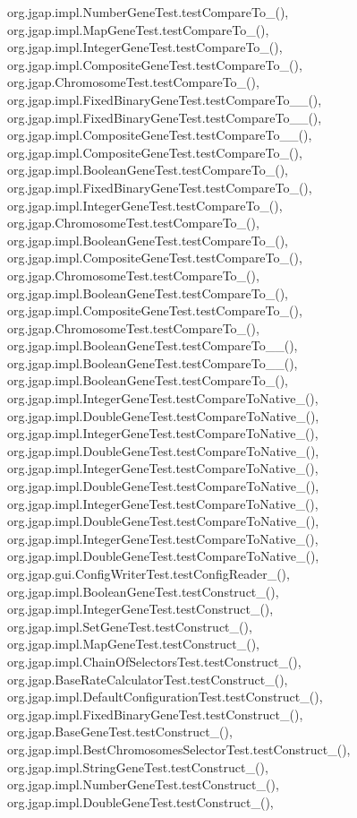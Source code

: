 org.\-jgap.\-impl.\-Number\-Gene\-Test.\-test\-Compare\-To\-\_(), org.\-jgap.\-impl.\-Map\-Gene\-Test.\-test\-Compare\-To\-\_(), org.\-jgap.\-impl.\-Integer\-Gene\-Test.\-test\-Compare\-To\-\_(), org.\-jgap.\-impl.\-Composite\-Gene\-Test.\-test\-Compare\-To\-\_(), org.\-jgap.\-Chromosome\-Test.\-test\-Compare\-To\-\_(), org.\-jgap.\-impl.\-Fixed\-Binary\-Gene\-Test.\-test\-Compare\-To\-\_\-\_(), org.\-jgap.\-impl.\-Fixed\-Binary\-Gene\-Test.\-test\-Compare\-To\-\_\-\_(), org.\-jgap.\-impl.\-Composite\-Gene\-Test.\-test\-Compare\-To\-\_\-\_(), org.\-jgap.\-impl.\-Composite\-Gene\-Test.\-test\-Compare\-To\-\_(), org.\-jgap.\-impl.\-Boolean\-Gene\-Test.\-test\-Compare\-To\-\_(), org.\-jgap.\-impl.\-Fixed\-Binary\-Gene\-Test.\-test\-Compare\-To\-\_(), org.\-jgap.\-impl.\-Integer\-Gene\-Test.\-test\-Compare\-To\-\_(), org.\-jgap.\-Chromosome\-Test.\-test\-Compare\-To\-\_(), org.\-jgap.\-impl.\-Boolean\-Gene\-Test.\-test\-Compare\-To\-\_(), org.\-jgap.\-impl.\-Composite\-Gene\-Test.\-test\-Compare\-To\-\_(), org.\-jgap.\-Chromosome\-Test.\-test\-Compare\-To\-\_(), org.\-jgap.\-impl.\-Boolean\-Gene\-Test.\-test\-Compare\-To\-\_(), org.\-jgap.\-impl.\-Composite\-Gene\-Test.\-test\-Compare\-To\-\_(), org.\-jgap.\-Chromosome\-Test.\-test\-Compare\-To\-\_(), org.\-jgap.\-impl.\-Boolean\-Gene\-Test.\-test\-Compare\-To\-\_\-\_(), org.\-jgap.\-impl.\-Boolean\-Gene\-Test.\-test\-Compare\-To\-\_\-\_(), org.\-jgap.\-impl.\-Boolean\-Gene\-Test.\-test\-Compare\-To\-\_(), org.\-jgap.\-impl.\-Integer\-Gene\-Test.\-test\-Compare\-To\-Native\-\_(), org.\-jgap.\-impl.\-Double\-Gene\-Test.\-test\-Compare\-To\-Native\-\_(), org.\-jgap.\-impl.\-Integer\-Gene\-Test.\-test\-Compare\-To\-Native\-\_(), org.\-jgap.\-impl.\-Double\-Gene\-Test.\-test\-Compare\-To\-Native\-\_(), org.\-jgap.\-impl.\-Integer\-Gene\-Test.\-test\-Compare\-To\-Native\-\_(), org.\-jgap.\-impl.\-Double\-Gene\-Test.\-test\-Compare\-To\-Native\-\_(), org.\-jgap.\-impl.\-Integer\-Gene\-Test.\-test\-Compare\-To\-Native\-\_(), org.\-jgap.\-impl.\-Double\-Gene\-Test.\-test\-Compare\-To\-Native\-\_(), org.\-jgap.\-impl.\-Integer\-Gene\-Test.\-test\-Compare\-To\-Native\-\_(), org.\-jgap.\-impl.\-Double\-Gene\-Test.\-test\-Compare\-To\-Native\-\_(), org.\-jgap.\-gui.\-Config\-Writer\-Test.\-test\-Config\-Reader\-\_(), org.\-jgap.\-impl.\-Boolean\-Gene\-Test.\-test\-Construct\-\_(), org.\-jgap.\-impl.\-Integer\-Gene\-Test.\-test\-Construct\-\_(), org.\-jgap.\-impl.\-Set\-Gene\-Test.\-test\-Construct\-\_(), org.\-jgap.\-impl.\-Map\-Gene\-Test.\-test\-Construct\-\_(), org.\-jgap.\-impl.\-Chain\-Of\-Selectors\-Test.\-test\-Construct\-\_(), org.\-jgap.\-Base\-Rate\-Calculator\-Test.\-test\-Construct\-\_(), org.\-jgap.\-impl.\-Default\-Configuration\-Test.\-test\-Construct\-\_(), org.\-jgap.\-impl.\-Fixed\-Binary\-Gene\-Test.\-test\-Construct\-\_(), org.\-jgap.\-Base\-Gene\-Test.\-test\-Construct\-\_(), org.\-jgap.\-impl.\-Best\-Chromosomes\-Selector\-Test.\-test\-Construct\-\_(), org.\-jgap.\-impl.\-String\-Gene\-Test.\-test\-Construct\-\_(), org.\-jgap.\-impl.\-Number\-Gene\-Test.\-test\-Construct\-\_(), org.\-jgap.\-impl.\-Double\-Gene\-Test.\-test\-Construct\-\_(), 
